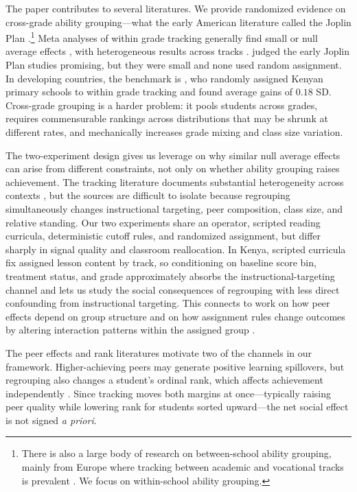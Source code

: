 \documentclass[11pt]{article}
\begin{document}
The paper contributes to several literatures. We provide randomized evidence on cross-grade ability grouping---what the early American literature called the Joplin Plan \citep{floyd:1954}.\footnote{There is also a large body of research on between-school ability grouping, mainly from Europe where tracking between academic and vocational tracks is prevalent \citep{fu2018ability,lavrijsen2015new}. We focus on within-school ability grouping.} Meta analyses of within grade tracking generally find small or null average effects \citep{slavin:1987,slavin1990achievement,kulik1987effects,terrin2022effect}, with heterogeneous results across tracks \citep{burke2013classroom,hoxby2005taking,antecol2016peer,garlick,de2022college}. \citet{slavin:1987} judged the early Joplin Plan studies promising, but they were small and none used random assignment. In developing countries, the benchmark is \citet{duflo2011peer}, who randomly assigned Kenyan primary schools to within grade tracking and found average gains of $0.18$ SD\@. Cross-grade grouping is a harder problem: it pools students across grades, requires commensurable rankings across distributions that may be shrunk at different rates, and mechanically increases grade mixing and class size variation.

The two-experiment design gives us leverage on why similar null average effects can arise from different constraints, not only on whether ability grouping raises achievement. The tracking literature documents substantial heterogeneity across contexts \citep{betts:2011,card2016can,vardardottir2013peer}, but the sources are difficult to isolate because regrouping simultaneously changes instructional targeting, peer composition, class size, and relative standing. Our two experiments share an operator, scripted reading curricula, deterministic cutoff rules, and randomized assignment, but differ sharply in signal quality and classroom reallocation. In Kenya, scripted curricula fix assigned lesson content by track, so conditioning on baseline score bin, treatment status, and grade approximately absorbs the instructional-targeting channel and lets us study the social consequences of regrouping with less direct confounding from instructional targeting. This connects to work on how peer effects depend on group structure \citep{hoxby2005taking,rjosk2022dispersion,vigdor2007peer} and on how assignment rules change outcomes by altering interaction patterns within the assigned group \citep{carrellsacerdotewest2013,garlick}.

The peer effects and rank literatures motivate two of the channels in our framework. Higher-achieving peers may generate positive learning spillovers, but regrouping also changes a student's ordinal rank, which affects achievement independently \citep{murphy2020top,bertoninistico2023}. Since tracking moves both margins at once---typically raising peer quality while lowering rank for students sorted upward---the net social effect is not signed \emph{a priori}.
\end{document}
